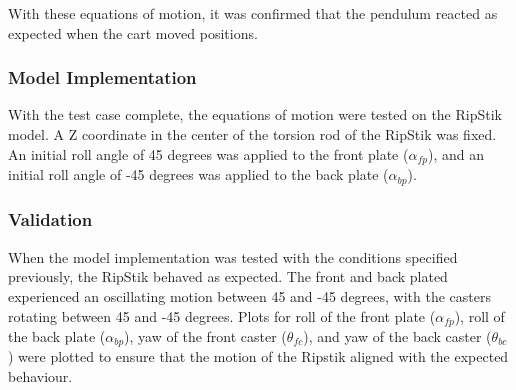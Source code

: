 With these equations of motion, it was confirmed that the pendulum reacted as expected when the cart moved positions.

\subsubsection{Model Implementation}

With the test case complete, the equations of motion were tested on the RipStik model. A Z coordinate in the center of the torsion rod of the RipStik was fixed.
An initial roll angle of 45 degrees was applied to the front plate ($\alpha_{fp}$), and an initial roll angle of -45 degrees was applied to the back plate ($\alpha_{bp}$). 

\subsubsection{Validation}

When the model implementation was tested with the conditions specified previously, the RipStik behaved as expected. 
The front and back plated experienced an oscillating motion between 45 and -45 degrees, with the casters rotating between 45 and -45 degrees. 
Plots for roll of the front plate ($\alpha_{fp}$), roll of the back plate ($\alpha_{bp}$), yaw of the front caster ($\theta_{fc}$), and yaw of the back caster ($\theta_{bc}$) were plotted to ensure that the motion of the Ripstik aligned with the expected behaviour.

